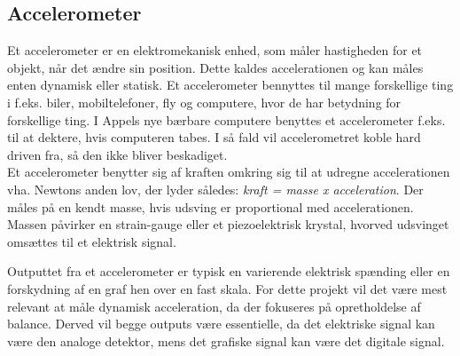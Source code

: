 \subsection{Accelerometer}
Et accelerometer er en elektromekanisk enhed, som måler hastigheden for et objekt, når det ændre sin position. Dette kaldes accelerationen og kan måles enten dynamisk eller statisk. Et accelerometer bennyttes til mange forskellige ting i f.eks. biler, mobiltelefoner, fly og computere, hvor de har betydning for forskellige ting. I Appels nye bærbare computere benyttes et accelerometer f.eks. til at dektere, hvis computeren tabes. I så fald vil accelerometret koble hard driven fra, så den ikke bliver beskadiget. \cite{Inc.2015,Academic2015c}\\
Et accelerometer benytter sig af kraften omkring sig til at udregne accelerationen vha. Newtons anden lov, der lyder således: \textit{kraft = masse x acceleration}. Der måles på en kendt masse, hvis udsving er proportional med accelerationen. Massen påvirker en strain-gauge eller et piezoelektrisk krystal, hvorved udsvinget omsættes til et elektrisk signal. \cite{Academic2015c,Krag2015} 

Outputtet fra et accelerometer er typisk en varierende elektrisk spænding eller en forskydning af en graf hen over en fast skala. For dette projekt vil det være mest relevant at måle dynamisk acceleration, da der fokuseres på opretholdelse af balance. Derved vil begge outputs være essentielle, da det elektriske signal kan være den analoge detektor, mens det grafiske signal kan være det digitale signal. \cite{Academic2015c}

